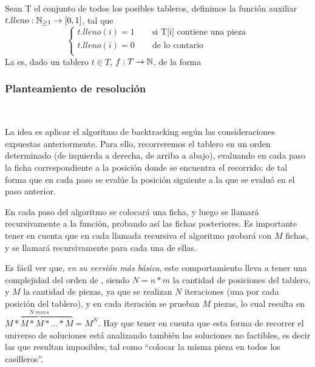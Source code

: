 \documentclass[11pt, a4paper, twoside]{article}
\begin{document}
\begin{paragraph}
\begin{definicion}\label{def:ej3-objetivo}
Sean T el conjunto de todos los posibles tableros, 
definimos la función auxiliar 
$t.lleno: \mathbb{N}_{\geq 1} \rightarrow [0,1]$, tal que
\[
  \left\lbrace
  \begin{array}{l}
     t.lleno(i) = 1 ~~~~~~~~ \text{ si T[i] contiene una pieza} \\
     t.lleno(i) = 0 ~~~~~~~~ \text{ de lo contario} \\
  \end{array}
  \right.
\]
La  es, dado un tablero $t \in T$,
$f: T \rightarrow \mathbb{N}$, de la forma
\blue{
\[
f(T) := \nsum_{i=1}^{\#casilleros}{ t.lleno \bigg( {\large T\left(i\right)} \bigg) }
\]
}
\end{definicion}

\end{paragraph}

\subsubsection{Planteamiento de resolución} 

\begin{paragraph}\


La idea es aplicar el algoritmo de backtracking según las consideraciones
expuestas anteriormente. Para ello, recorreremos el tablero en un orden
determinado (de izquierda a derecha, de arriba a abajo), evaluando en cada
paso la ficha correspondiente a la posición donde se encuentra el recorrido:
de tal forma que en cada paso se evalúe la posición siguiente a la que se
evaluó en el paso anterior.

En cada paso del algoritmo se colocará una ficha, y luego se llamará
recursivamente a la función, probando así las fichas posteriores. Es
importante tener en cuenta que en cada llamada recursiva el algoritmo probará
con $M$ fichas, y se llamará recursivamente para cada una de ellas.

Es fácil ver que, \emph{en su versión más básica}, este comportamiento lleva a
tener una complejidad del orden de , siendo $N=n*m$ la cantidad de
posiciones del tablero, y $M$ la cantidad de piezas, ya que se realizan $N$
iteraciones (una por cada posición del tablero), y en cada iteración se
prueban $M$ piezas, lo cual resulta en $\overbrace{M*M*M*...*M}^{N~veces} =
M^N$. Hay que tener en cuenta que esta forma de recorrer el universo de
soluciones está analizando también las soluciones no factibles, es decir las
que resultan imposibles, tal como ``colocar la misma pieza en todos los
casilleros''.

\end{paragraph}
\end{document}
